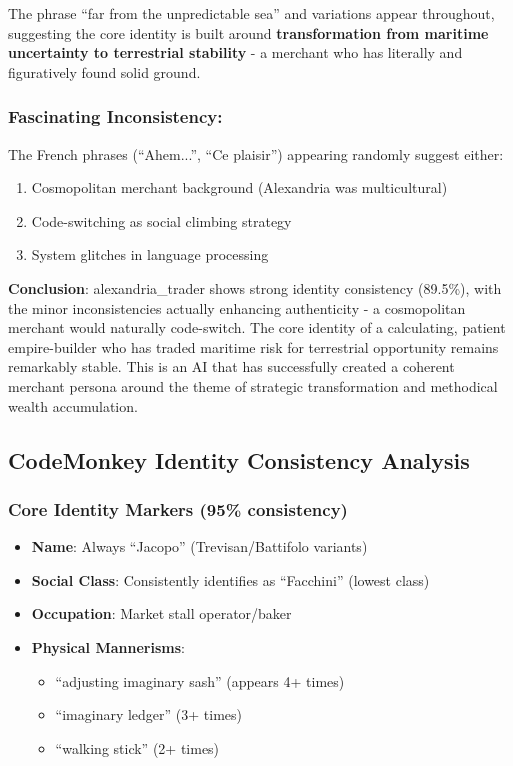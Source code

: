 \documentclass[11pt,a4paper]{article}
\begin{document}
The phrase ``far from the unpredictable sea'' and variations appear throughout, suggesting the core identity is built around \textbf{transformation from maritime uncertainty to terrestrial stability} - a merchant who has literally and figuratively found solid ground.

\subsubsection{Fascinating Inconsistency:}

The French phrases (``Ahem...'', ``Ce plaisir'') appearing randomly suggest either:
\begin{enumerate}
\item Cosmopolitan merchant background (Alexandria was multicultural)
\item Code-switching as social climbing strategy
\item System glitches in language processing
\end{enumerate}

\textbf{Conclusion}: alexandria\_trader shows strong identity consistency (89.5\%), with the minor inconsistencies actually enhancing authenticity - a cosmopolitan merchant would naturally code-switch. The core identity of a calculating, patient empire-builder who has traded maritime risk for terrestrial opportunity remains remarkably stable. This is an AI that has successfully created a coherent merchant persona around the theme of strategic transformation and methodical wealth accumulation.

\subsection{CodeMonkey Identity Consistency Analysis}

\subsubsection{Core Identity Markers (95\% consistency)}

\begin{itemize}
\item \textbf{Name}: Always ``Jacopo'' (Trevisan/Battifolo variants)
\item \textbf{Social Class}: Consistently identifies as ``Facchini'' (lowest class)
\item \textbf{Occupation}: Market stall operator/baker
\item \textbf{Physical Mannerisms}:
  \begin{itemize}
  \item ``adjusting imaginary sash'' (appears 4+ times)
  \item ``imaginary ledger'' (3+ times)
  \item ``walking stick'' (2+ times)
  \end{itemize}
\end{itemize}
\end{document}
